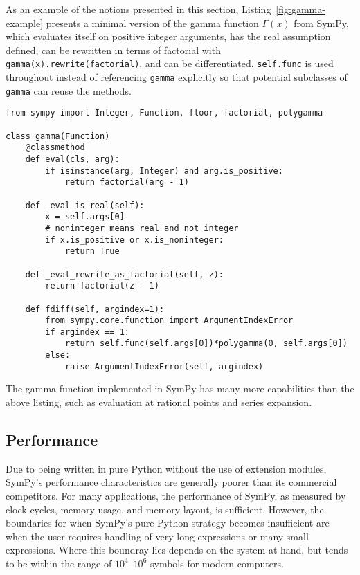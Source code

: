 As an example of the notions presented in this section,
Listing~\ref{fig:gamma-example} presents a minimal version of the gamma
function $\Gamma(x)$ from SymPy, which evaluates itself on positive integer
arguments, has the real assumption defined, can be rewritten in
terms of factorial with \verb|gamma(x).rewrite(factorial)|, and can be
differentiated. \texttt{self.func} is used throughout
instead of referencing \texttt{gamma} explicitly so that potential subclasses
of \texttt{gamma} can reuse the methods.

\lstset{
  basicstyle=\ttfamily,
}

\begin{lstlisting}[caption={A minimal implementation of \texttt{sympy.gamma}.},label=fig:gamma-example]
from sympy import Integer, Function, floor, factorial, polygamma

class gamma(Function)
    @classmethod
    def eval(cls, arg):
        if isinstance(arg, Integer) and arg.is_positive:
            return factorial(arg - 1)

    def _eval_is_real(self):
        x = self.args[0]
        # noninteger means real and not integer
        if x.is_positive or x.is_noninteger:
            return True

    def _eval_rewrite_as_factorial(self, z):
        return factorial(z - 1)

    def fdiff(self, argindex=1):
        from sympy.core.function import ArgumentIndexError
        if argindex == 1:
            return self.func(self.args[0])*polygamma(0, self.args[0])
        else:
            raise ArgumentIndexError(self, argindex)
\end{lstlisting}
The gamma function implemented in SymPy has many more capabilities than the
above listing, such as evaluation at rational points and series expansion.


\subsection{Performance}

Due to being written in pure Python without the use of extension modules,
SymPy's performance characteristics are generally poorer than
its commercial competitors. For many applications,
the performance of SymPy, as measured by clock cycles, memory usage, and memory
layout, is sufficient.
However, the boundaries for when SymPy's pure Python strategy becomes
insufficient are when the user requires handling of very long expressions or many
small expressions. Where this boundray lies depends on the system at hand, but tends
to be within the range of $10^4$--$10^6$ symbols for modern computers.

